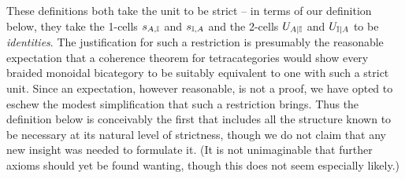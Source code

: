 These definitions both take the unit to be strict -- in terms of
our definition below, they take the 1-cells $s_{A,{\mathbb{I}}}$ and $s_{{\mathbb{I}},A}$
and the 2-cells $U_{A|{\mathbb{I}}}$ and $U_{{\mathbb{I}}|A}$ to be \emph{identities}.
The justification for such a restriction is presumably the reasonable
expectation that a coherence theorem for tetracategories would
show every braided monoidal bicategory to be suitably equivalent
to one with such a strict unit. Since an expectation, however
reasonable, is not a proof, we have opted to eschew the modest
simplification that such a restriction brings.
%
Thus the definition below is conceivably the first that
includes all the structure known to be necessary at its natural level
of strictness, though we do not claim that any new insight was needed
to formulate it. (It is not unimaginable that further axioms should yet
be found wanting, though this does not seem especially likely.)
%
